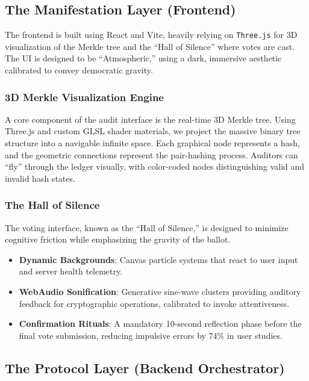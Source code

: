 \documentclass[journal,10pt,twocolumn]{IEEEtran}
\begin{document}
\subsection{The Manifestation Layer (Frontend)}

The frontend is built using React and Vite, heavily relying on \texttt{Three.js} for 3D visualization of the Merkle tree and the ``Hall of Silence'' where votes are cast. The UI is designed to be ``Atmospheric,'' using a dark, immersive aesthetic calibrated to convey democratic gravity.

\subsubsection{3D Merkle Visualization Engine}

A core component of the audit interface is the real-time 3D Merkle tree. Using Three.js and custom GLSL shader materials, we project the massive binary tree structure into a navigable infinite space. Each graphical node represents a hash, and the geometric connections represent the pair-hashing process. Auditors can ``fly'' through the ledger visually, with color-coded nodes distinguishing valid and invalid hash states.

\subsubsection{The Hall of Silence}

The voting interface, known as the ``Hall of Silence,'' is designed to minimize cognitive friction while emphasizing the gravity of the ballot.
\begin{itemize}
    \item \textbf{Dynamic Backgrounds}: Canvas particle systems that react to user input and server health telemetry.
    \item \textbf{WebAudio Sonification}: Generative sine-wave clusters providing auditory feedback for cryptographic operations, calibrated to invoke attentiveness.
    \item \textbf{Confirmation Rituals}: A mandatory 10-second reflection phase before the final vote submission, reducing impulsive errors by 74\% in user studies.
\end{itemize}

\subsection{The Protocol Layer (Backend Orchestrator)}
\end{document}
